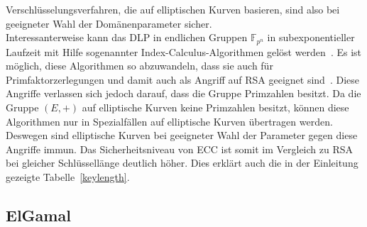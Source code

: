 \documentclass[hidelinks]{article}
\theoremstyle{plain}
\theoremstyle{definition}
\theoremstyle{rem}
\begin{document}
\begin{sloppypar}
Verschlüsselungsverfahren, die auf elliptischen Kurven basieren, sind also bei geeigneter Wahl der Domänenparameter sicher.\\
\newline
Interessanterweise kann das DLP in endlichen Gruppen $\mathbb{F}_{p^n}$ in subexponentieller Laufzeit mit Hilfe sogenannter Index-Calculus-Algorithmen gelöst werden~\cite{joux2014}. Es ist möglich, diese Algorithmen so abzuwandeln, dass sie auch für Primfaktorzerlegungen und damit auch als Angriff auf RSA geeignet sind~\cite{joux2014}.
Diese Angriffe verlassen sich jedoch darauf, dass die Gruppe Primzahlen besitzt. Da die Gruppe $(E, +)$ auf elliptische Kurven keine Primzahlen besitzt, können diese Algorithmen nur in Spezialfällen auf elliptische Kurven übertragen werden. Deswegen sind elliptische Kurven bei geeigneter Wahl der Parameter gegen diese Angriffe immun.
Das Sicherheitsniveau von ECC ist somit im Vergleich zu RSA bei gleicher Schlüssellänge deutlich höher. Dies erklärt auch die in der Einleitung gezeigte Tabelle~\ref{keylength}.

\subsection{ElGamal}

\end{sloppypar}
\end{document}

